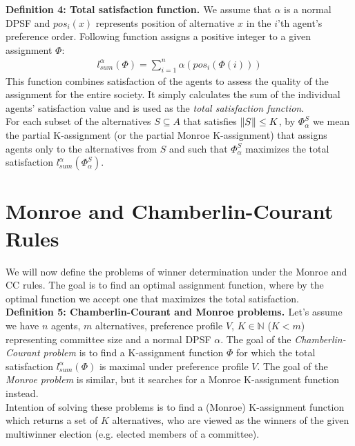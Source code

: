 \noindent
\textbf{Definition 4: Total satisfaction function. \cite{1}} \hspace{.1in} We assume that $\alpha$ is a normal DPSF and $pos_{i}(x)$ represents position of alternative $x$ in the $i$'th agent's preference order. Following function assigns a positive integer to a given assignment $\Phi$:
\begin{gather}
	l^{\alpha}_{sum}(\Phi) = \sum^{n}_{i=1} \alpha (pos_{i}(\Phi(i)))
\end{gather}
This function combines satisfaction of the agents to assess the quality of the assignment for the entire society. It simply calculates the sum of the individual agents' satisfaction value and is used as the \textit{total satisfaction function}.
\\

For each subset of the alternatives $S \subseteq A$ that satisfies $\lVert S\rVert \leq K$, by $\Phi^{S}_{\alpha}$ we mean the partial K-assignment (or the partial Monroe K-assignment) that assigns agents only to the alternatives from $S$ and such that $\Phi^{S}_{\alpha}$ maximizes the total satisfaction $l^{\alpha}_{sum}(\Phi^{S}_{\alpha})$.

\section{Monroe and Chamberlin-Courant Rules}

We will now define the problems of winner determination under the Monroe and CC rules. The goal is to find an optimal assignment function, where by the optimal function we accept one that maximizes the total satisfaction.
\\

\noindent
\textbf{Definition 5: Chamberlin-Courant and Monroe problems. \cite{1}} \hspace{.1in}  Let's assume we have $n$ agents, $m$ alternatives, preference profile $V$, $K \in \mathbb{N}$ ($K < m$) representing committee size and a normal DPSF $\alpha$. The goal of the \textit{Chamberlin-Courant problem} is to find a K-assignment function $\Phi$ for which the total satisfaction $l^{\alpha}_{sum}(\Phi)$ is maximal under preference profile $V$. The goal of the \textit{Monroe problem} is similar, but it searches for a Monroe K-assignment function instead.
\\

Intention of solving these problems is to find a (Monroe) K-assignment function which returns a set of $K$ alternatives, who are viewed as the winners of the given multiwinner election (e.g. elected members of a committee).

